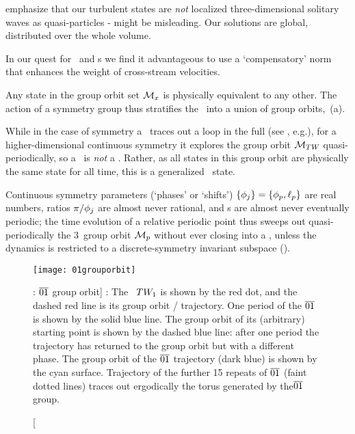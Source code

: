 													\toCB
emphasize that our turbulent states are \emph{not} localized
three-dimensional solitary waves as quasi-particles -
 might be misleading. Our solutions are global,
distributed over the whole volume.

In our quest for \reqva\ and \rpo s we
find it advantageous to use a `compensatory' norm %
that enhances the weight of cross-stream velocities.

Any state in the  group orbit set ${\cal M}_{x}$ is physically equivalent
to any other. The action of a symmetry group thus stratifies the
\statesp\ into a union of group orbits, \,{(a)}.

While in the case of  symmetry a \reqv\ traces out a loop in the
full \statesp (see , e.g.), for a
higher-dimensional continuous symmetry it explores the group orbit
${\cal M}_{TW_{}}$ quasi-periodically, so a \reqv\ is \emph{not} a \po.
Rather, as all states in this group orbit are physically the same state
for all time, this is a generalized \eqv\ state.

Continuous symmetry parameters (`phases' or `shifts')
$\{{\bf \phi}_j\}=\{\phi_p,\ell_p\}$ are real numbers, ratios
$\pi/{\bf \phi}_j$ are almost never rational, and \rpo s are almost never
eventually periodic; the time evolution of a relative periodic point thus
sweeps out quasi-periodically the $3$\dmn\ group orbit ${\cal M}_p$ without
ever closing into a \po, unless the dynamics is restricted to a
discrete-symmetry invariant subspace ().

\begin{figure}
\begin{center}
  \texttt{[image: 01grouporbit]}
\end{center}
  \caption
  [\CLf: $\overline{01}$ {\rpo} group orbit]{
  \CLf: The \reqv\ $TW_{1}$ is shown by the red dot, and the dashed
  red line is its group orbit / trajectory. One period of the
  $\overline{01}$ {\rpo} is shown by the solid blue line. The group orbit of
  its (arbitrary) starting point is shown by the dashed blue line: after
  one period the trajectory has returned to the group orbit but with a
  different phase. The group orbit of the $\overline{01}$ trajectory (dark
  blue) is shown by the cyan surface. Trajectory of the further 15
  repeats of $\overline{01}$ (faint dotted lines) traces out ergodically the
  torus generated by the$\overline{01}$  group.
  }
\label{fig:CLf01group1}
\end{figure}


